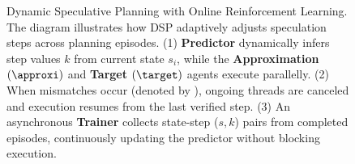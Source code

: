 \begin{figure}
{
    }
    \caption{Dynamic Speculative Planning with Online Reinforcement Learning. The diagram illustrates how DSP adaptively adjusts speculation steps across planning episodes. (1) \textbf{Predictor} dynamically infers step values $k$ from current state $s_i$, while the \textbf{Approximation $(\approxi)$} and \textbf{Target $(\target)$} agents execute parallelly. (2) When mismatches occur (denoted by \textcolor{red}{}), ongoing threads are canceled and execution resumes from the last verified step. (3) An asynchronous \textbf{Trainer} collects state-step ($s, k$) pairs from completed episodes, continuously updating the predictor without blocking execution.}
    \label{fig:main_graph}
    \vspace{-4.5pt}
    
\end{figure}
